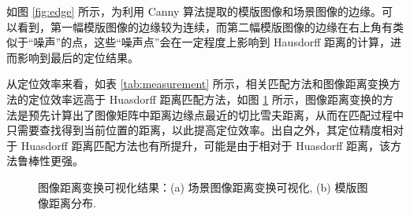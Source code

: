 如图 \ref{fig:edge} 所示，为利用 Canny 算法提取的模版图像和场景图像的边缘。可以看到，第一幅模版图像的边缘较为连续，而第二幅模版图像的边缘在右上角有类似于“噪声”的点，这些“噪声点”会在一定程度上影响到 Hausdorff 距离的计算，进而影响到最后的定位结果。

\begin{table}[!htbp]
\caption{不同匹配方法的定位效率比较}
\centering
\label{tab:measurement}
\end{table}

从定位效率来看，如表 \ref{tab:measurement} 所示，相关匹配方法和图像距离变换方法的定位效率远高于 Huasdorff 距离匹配方法，如图 \ref{fig:transform} 所示，图像距离变换的方法是预先计算出了图像矩阵中距离边缘点最近的切比雪夫距离，从而在匹配过程中只需要查找得到当前位置的距离，以此提高定位效率。出自之外，其定位精度相对于 Huasdorff 距离匹配方法也有所提升，可能是由于相对于 Huasdorff 距离，该方法鲁棒性更强。

\begin{figure}[!ht]
\centering
  \begin{minipage}[b]{\linewidth} 
  \end{minipage}
  \vfill
  \caption{图像距离变换可视化结果：(a) 场景图像距离变换可视化, (b) 模版图像距离分布.}
	\label{fig:transform}
\end{figure}

